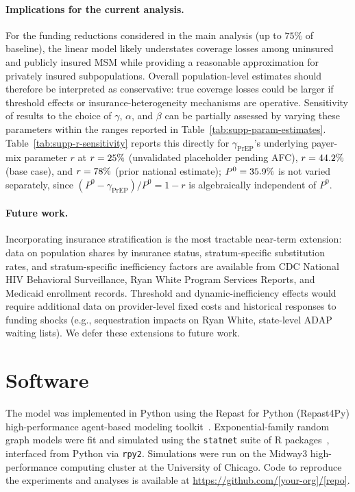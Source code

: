 \documentclass[preprint,12pt]{elsarticle}
\begin{document}
{\paragraph{Implications for the current analysis.}
For the funding reductions considered in the main analysis (up to $75\%$ of baseline), the linear model likely understates coverage losses among uninsured and publicly insured MSM while providing a reasonable approximation for privately insured subpopulations. Overall population-level estimates should therefore be interpreted as conservative: true coverage losses could be larger if threshold effects or insurance-heterogeneity mechanisms are operative. Sensitivity of results to the choice of $\gamma$, $\alpha$, and $\beta$ can be partially assessed by varying these parameters within the ranges reported in Table~\ref{tab:supp-param-estimates}. Table~\ref{tab:supp-r-sensitivity} reports this directly for $\gamma_{\text{PrEP}}$'s underlying payer-mix parameter $r$ at $r=25\%$ (unvalidated placeholder pending AFC), $r=44.2\%$ (base case), and $r=78\%$ (prior national estimate); $P^{0}=35.9\%$ is not varied separately, since $(P^{0}-\gamma_{\text{PrEP}})/P^{0}=1-r$ is algebraically independent of $P^{0}$.



\paragraph{Future work.}
Incorporating insurance stratification is the most tractable near-term extension: data on population shares by insurance status, stratum-specific substitution rates, and stratum-specific inefficiency factors are available from CDC National HIV Behavioral Surveillance, Ryan White Program Services Reports, and Medicaid enrollment records. Threshold and dynamic-inefficiency effects would require additional data on provider-level fixed costs and historical responses to funding shocks (e.g., sequestration impacts on Ryan White, state-level ADAP waiting lists). We defer these extensions to future work.

} 

\section{Software}
\label{sec:supp-software}
The model was implemented in Python using the Repast for Python (Repast4Py) high-performance agent-based modeling toolkit~\cite{collier_distributed_2022}. Exponential-family random graph models were fit and simulated using the \texttt{statnet} suite of R packages~\cite{handcock_statnet_2008, goodreau_statnet_2008}, interfaced from Python via \texttt{rpy2}. Simulations were run on the Midway3 high-performance computing cluster at the University of Chicago. Code to reproduce the experiments and analyses is available at \url{https://github.com/[your-org]/[repo]}.

\ifnum{}\relax
  
  
  
\end{document}
